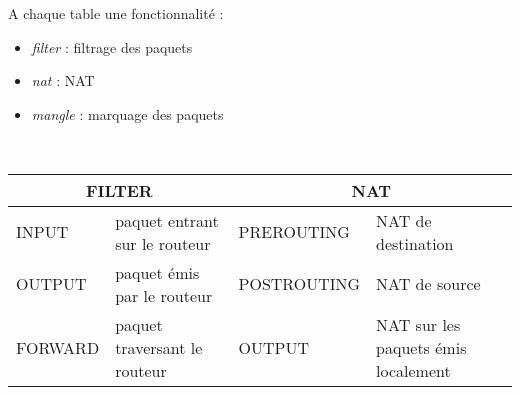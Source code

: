 \documentclass[journal, a4paper]{IEEEtran}
\begin{document}
A chaque table une fonctionnalité :
\begin{itemize}
	\item \textit{filter} : filtrage des paquets
	\item \textit{nat} : NAT
	\item \textit{mangle} : marquage des paquets
\end{itemize}
~\\
\begin{tabular}{|p{1.7cm}|p{1.9cm}|p{2.5cm}|p{1.9cm}|}
  \hline
  \multicolumn{2}{|c|}{\textsc{FILTER}} & \multicolumn{2}{c|}{\textsc{NAT}} \\
  \hline
  \textsc{INPUT} & paquet entrant sur le routeur & \textsc{PREROUTING} & NAT de destination \\
  \hline
  \textsc{OUTPUT} & paquet émis par le routeur & \textsc{POSTROUTING} & NAT de source \\
  \hline
  \textsc{FORWARD} & paquet traversant le routeur & \textsc{OUTPUT} & NAT sur les paquets émis localement \\
  \hline
\end{tabular}
~\\
~\\


\end{document}
